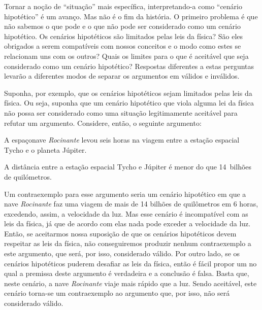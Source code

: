 Tornar a noção de ``situação'' mais específica, interpretando-a como ``cenário hipotético'' é um avanço.
Mas não é o fim da história.
O primeiro problema é que não sabemos o que pode e o que não pode ser considerado como um cenário hipotético.
Os cenários hipotéticos são limitados pelas leis da física?
São eles obrigados a serem compatíveis com nossos conceitos e o modo como estes se relacionam uns com os outros?
Quais os limites para o que é aceitável que seja considerado como um cenário hipotético?
Respostas diferentes a estas perguntas levarão a diferentes modos de separar os argumentos em válidos e inválidos.

Suponha, por exemplo, que os cenários hipotéticos sejam limitados pelas leis da física.
Ou seja, suponha que um cenário hipotético que viola alguma lei da física não possa ser considerado como uma situação legitimamente aceitável para refutar um argumento.
Considere, então, o seguinte argumento:
	\begin{earg}
		\item[] A espaçonave \emph{Rocinante} levou seis horas na viagem entre a estação espacial Tycho e o planeta Júpiter.
		\item[\therefore] A distância entre a estação espacial Tycho e Júpiter é menor do que 14~bilhões de quilómetros.
	\end{earg}
Um contraexemplo para esse argumento seria um cenário hipotético em que a nave \emph{Rocinante} faz uma viagem de mais de 14 bilhões de quilômetros em 6 horas, excedendo, assim, a velocidade da luz.
Mas esse cenário é incompatível com as leis da física, já que de acordo com elas nada pode exceder a velocidade da luz.
Então, se aceitarmos nossa suposição de que os cenários hipotéticos devem respeitar as leis da física, não conseguiremos produzir nenhum contraexemplo a este argumento, que será, por isso, considerado válido.
Por outro lado, se os cenários hipotéticos puderem desafiar as leis da física, então é fácil propor um no qual a premissa deste argumento é verdadeira e a conclusão é falsa.
Basta que, neste cenário, a nave \emph{Rocinante} viaje mais rápido que a luz.
Sendo aceitável, este cenário torna-se um contraexemplo ao argumento que, por isso, não será considerado válido.	

